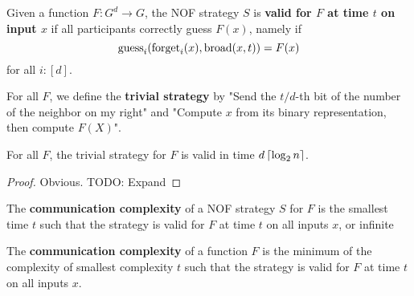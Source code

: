 \begin{definition}
  \label{def:valid-strategy}
  \leanok

  Given a function $F : G^d \to G$, the NOF strategy $S$ is {\bf valid for $F$ at time $t$ on input $x$} if all participants correctly guess $F(x)$, namely if
  $$\operatorname{guess}_i(\operatorname{forget}_i(x), \operatorname{broad}(x, t)) = F(x)$$
  for all $i : [d]$.
\end{definition}

\begin{definition}
  \label{def:trivial-strategy}

  For all $F$, we define the {\bf trivial strategy} by "Send the $t / d$-th bit of the number of the neighbor on my right" and "Compute $x$ from its binary representation, then compute $F(X)$".
\end{definition}

\begin{lemma}
  \label{lem:trivial-strategy-valid}

  For all $F$, the trivial strategy for $F$ is valid in time $d\left\lceil \log_2 n\right\rceil$.
\end{lemma}
\begin{proof}

  Obvious. TODO: Expand
\end{proof}

\begin{definition}
  \label{def:strategy-complexity}

  The {\bf communication complexity} of a NOF strategy $S$ for $F$ is the smallest time $t$ such that the strategy is valid for $F$ at time $t$ on all inputs $x$, or infinite
\end{definition}

\begin{definition}
  \label{def:function-complexity}

  The {\bf communication complexity} of a function $F$ is the minimum of the complexity of smallest complexity $t$ such that the strategy is valid for $F$ at time $t$ on all inputs $x$.
\end{definition}

